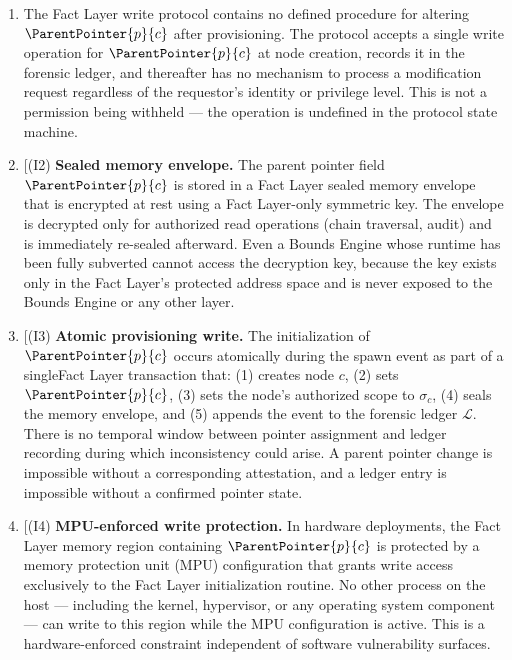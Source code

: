 \begin{enumerate}
    \item[(I1) \textbf{No modification operation defined.}] The Fact Layer write protocol contains no defined procedure for altering $\ParentPointer{p}{c}$ after provisioning. The protocol accepts a single write operation for $\ParentPointer{p}{c}$ at node creation, records it in the forensic ledger, and thereafter has no mechanism to process a modification request regardless of the requestor's identity or privilege level. This is not a permission being withheld --- the operation is undefined in the protocol state machine.

    \item[(I2) \textbf{Sealed memory envelope.} The parent pointer field $\ParentPointer{p}{c}$ is stored in a Fact Layer sealed memory envelope that is encrypted at rest using a Fact Layer-only symmetric key. The envelope is decrypted only for authorized read operations (chain traversal, audit) and is immediately re-sealed afterward. Even a Bounds Engine whose runtime has been fully subverted cannot access the decryption key, because the key exists only in the Fact Layer's protected address space and is never exposed to the Bounds Engine or any other layer.

    \item[(I3) \textbf{Atomic provisioning write.} The initialization of $\ParentPointer{p}{c}$ occurs atomically during the spawn event as part of a singleFact Layer transaction that: (1) creates node $c$, (2) sets $\ParentPointer{p}{c}$, (3) sets the node's authorized scope to $\sigma_c$, (4) seals the memory envelope, and (5) appends the event to the forensic ledger $\mathcal{L}$. There is no temporal window between pointer assignment and ledger recording during which inconsistency could arise. A parent pointer change is impossible without a corresponding attestation, and a ledger entry is impossible without a confirmed pointer state.

    \item[(I4) \textbf{MPU-enforced write protection.} In hardware deployments, the Fact Layer memory region containing $\ParentPointer{p}{c}$ is protected by a memory protection unit (MPU) configuration that grants write access exclusively to the Fact Layer initialization routine. No other process on the host --- including the kernel, hypervisor, or any operating system component --- can write to this region while the MPU configuration is active. This is a hardware-enforced constraint independent of software vulnerability surfaces.
\end{enumerate}


